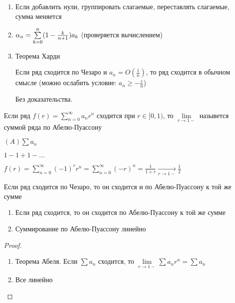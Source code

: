 \begin{observation}
    \leavevmode
    \begin{enumerate}
        \item Если добавлить нули, группировать слагаемые, переставлять слагаемые, сумма меняется
        \item $\alpha_n = \sum\limits_{k=0}^n(1 - \frac{k}{n+1})a_k$ (проверяется вычислением)
        \item Теорема Харди
        
              Если ряд сходится по Чезаро и $a_n = O(\frac{1}{n})$, то ряд сходится в обычном смысле (можно ослабить условие: $a_n \geq -\frac{c}{n}$)
              
              Без доказательства.
    \end{enumerate}
\end{observation}

\begin{definition}
    Если ряд $f(r) = \sum\limits_{n = 0}^\infty a_nr^n$ сходится при $r \in [0, 1)$, то $\lim\limits_{r \to 1-}$ назывется суммой ряда по Абелю-Пуассону
\end{definition}

\begin{designation}
    $(A)\sum a_n$
\end{designation}

\begin{example}
    $1 - 1 + 1 - \ldots $
    
    $f(r) = \sum\limits_{n =0}^\infty (-1)^rr^n = \sum\limits_{n = 0}^\infty (-r)^n = \frac{1}{1 + r} \xrightarrow[r \to 1-]{} \frac{1}{2}$
\end{example}

\begin{observation}
    Если ряд сходится по Чезаро, то он сходится и по Абелю-Пуассону к той же сумме
\end{observation}

\begin{theorem}
    \leavevmode
    \begin{enumerate}
        \item Если ряд сходится, то он сходится по Абелю-Пуассону к той же сумме
        \item Суммирование по Абелю-Пуассону линейно
    \end{enumerate}
\end{theorem}

\begin{proof}
    \leavevmode
    \begin{enumerate}
        \item Теорема Абеля. Если $\sum a_n$ сходится, то $\lim\limits_{r \to 1-} \sum a_nr^n = \sum a_n$
        \item Все линейно
    \end{enumerate}
\end{proof}


\newpage

